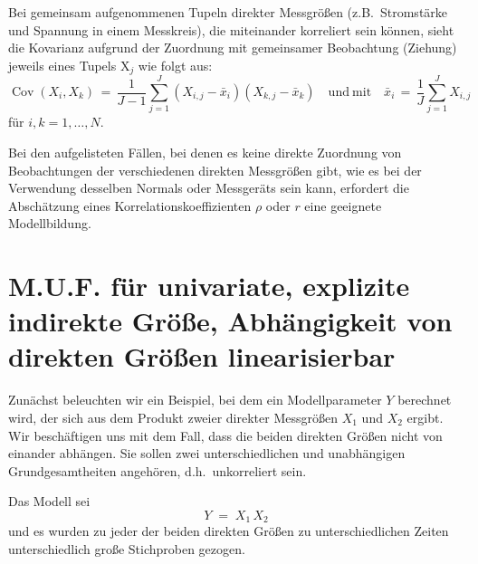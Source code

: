 Bei gemeinsam aufgenommenen Tupeln direkter Messgrößen (z.B.\ Stromstärke und Spannung in
einem Messkreis), die miteinander korreliert sein können, sieht die Kovarianz aufgrund
der Zuordnung mit gemeinsamer Beobachtung (Ziehung) jeweils eines Tupels $\mathrm{X}_j$ wie folgt aus:
$$
\operatorname{Cov}(X_i, X_k) \, = \,
\frac{1}{J-1} \sum_{j=1}^J (X_{i,j} - \bar x_i) (X_{k,j} - \bar x_k)
 \quad \mathrm{und~mit}
\quad  \bar x_i \, = \, \frac{1}{J} \sum_{j=1}^J X_{i,j}
$$
für $i,k = 1,\dots, N$.

Bei den aufgelisteten Fällen, bei denen es keine direkte Zuordnung von Beobachtungen
der verschiedenen direkten Messgrößen gibt, wie es bei der Verwendung desselben Normals oder
Messgeräts sein kann, erfordert die Abschätzung eines Korrelationskoeffizienten
$\rho$ oder $r$ eine geeignete Modellbildung.


\section{M.U.F. für univariate, explizite indirekte Größe, Abhängigkeit von direkten Größen linearisierbar}

Zunächst beleuchten wir ein Beispiel, bei dem ein Modellparameter $Y$ berechnet wird,
der sich aus dem Produkt zweier direkter
Messgrößen $X_1$ und $X_2$ ergibt. Wir beschäftigen uns mit dem Fall, dass
die beiden direkten Größen nicht von einander abhängen. Sie sollen zwei unterschiedlichen
und unabhängigen Grundgesamtheiten angehören, d.h.\ unkorreliert sein.

Das Modell sei
\begin{equation}
Y \; = \; X_1 \, X_2
\label{BeispielProdukt2Gr}
\end{equation}
und es wurden zu jeder der beiden direkten Größen zu unterschiedlichen Zeiten unterschiedlich
große Stichproben gezogen.


